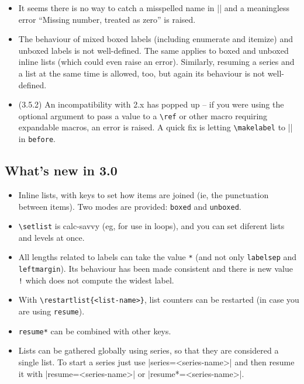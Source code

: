 \documentclass[a4paper]{ltxguide}
\newcommand\3{\unskip\enspace\fbox{\fontsize{4}{4}\selectfont NEW 3.0}}
\begin{document}
\begin{enumerate}[leftmargin=*]
\begin{enumerate}[leftmargin=\parindent]
\begin{enumerate}[labelindent=\parindent,|\allowbreak
| leftmargin=*,|\allowbreak| label=\Roman*.,|\allowbreak
| widest=IV,|\allowbreak| align=left]
\begin{enumerate}[label=\fbox{\arabic*}]
\begin{itemize}
\item
It seems there is no way to catch a misspelled name in |\setlist|
and a meaningless error ``Missing number, treated as zero'' is raised.

\item The behaviour of mixed boxed labels (including enumerate and
itemize) and unboxed labels is not well-defined.  The same applies to
boxed and unboxed inline lists (which could even raise an error).
Similarly, resuming a series and a list at the same time is allowed,
too, but again its behaviour is not well-defined.

\item (3.5.2) An incompatibility with 2.x has popped up -- if you were
using the optional argument to pass a value to a \verb|\ref| or other 
macro requiring expandable macros, an error is raised. A quick fix 
is letting \verb|\makelabel| to |\descriptionlabel| in \texttt{before}.

\end{itemize}

\subsection{What's new in 3.0}

\begin{itemize}
\item Inline lists, with keys to set how items are joined (ie, the
punctuation between items).  Two modes are provided: \verb|boxed|  and
\verb|unboxed|.

\item \verb|\setlist| is \textsf{calc}-savvy (eg, for use in loops),
and you can set diferent lists and levels at once.  \item All lengths
related to labels can take the value \verb|*| (and not only
\verb|labelsep| and \verb|leftmargin|).  Its behaviour has been made
consistent and there is new value \verb|!| which does not compute the
widest label.

\item With \verb|\restartlist{<list-name>}|, list counters can be restarted (in
case you are using \verb|resume|).

\item \verb|resume*| can be combined with other keys.

\item Lists can be gathered globally using series, so that they are
considered a single list.  To start a series just use
|series=<series-name>| and then resume it with |resume=<series-name>| or
|resume*=<series-name>|.


\end{itemize}
\end{enumerate}
\end{enumerate}
\end{enumerate}
\end{enumerate}
\end{document}
